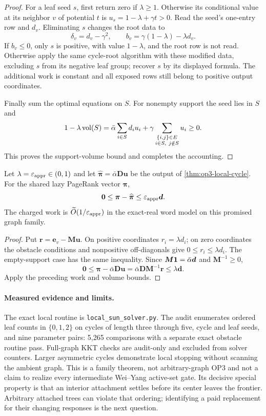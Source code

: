\begin{proof}
For a leaf seed $s$, first return zero if $\lambda\geq1$. Otherwise its
conditional value at its neighbor $v$ of potential $t$ is
$u_s=1-\lambda+\gamma t>0$. Read the seed's one-entry row and $d_v$.
Eliminating $s$ changes the root data to
\[
 \delta_v=d_v-\gamma^2,\qquad
 b_v=\gamma(1-\lambda)-\lambda d_v.
\]
If $b_v\leq0$, only $s$ is positive, with value $1-\lambda$, and the
root row is not read. Otherwise apply the same cycle-root algorithm with
these modified data, excluding $s$ from its negative leaf group; recover
$s$ by its displayed formula. The additional work is constant and all
exposed rows still belong to positive output coordinates.

Finally sum the optimal equations on $S$. For nonempty support the seed
lies in $S$ and
\[
 1-\lambda\operatorname{vol}(S)
 =\bar\alpha\sum_{i\in S}d_i u_i
   +\gamma\sum_{\substack{\{i,j\}\in E\\i\in S,\ j\notin S}}u_i
 \geq0.
\]
This proves the support-volume bound and completes the accounting.
\end{proof}

\begin{corollary}
\label{cor:op3-local-cycle-acl}
Let $\lambda=\varepsilon_{\mathrm{appr}}\in(0,1)$ and let
$\widehat{\bm\pi}=\bar\alpha\bm D\bm u$ be the output of
\cref{thm:op3-local-cycle}. For the shared lazy PageRank vector $\bm\pi$,
\[
 \bm0\leq\bm\pi-\widehat{\bm\pi}\leq\varepsilon_{\mathrm{appr}}\bm d.
\]
The charged work is $\widetilde O(1/\varepsilon_{\mathrm{appr}})$ in the exact-real word
model on this promised graph family.
\end{corollary}
\begin{proof}
Put $\bm r=\bm e_v-\bm M\bm u$. On positive coordinates
$r_i=\lambda d_i$; on zero coordinates the obstacle conditions and
nonpositive off-diagonals give $0\leq r_i\leq\lambda d_i$.
The empty-support case has the same inequality. Since
$\bm M\mathbf{1}=\bar\alpha\bm d$ and $\bm M^{-1}\geq0$,
\[
 \bm0\leq\bm\pi-\bar\alpha\bm D\bm u
 =\bar\alpha\bm D\bm M^{-1}\bm r
 \leq\lambda\bm d.
\]
Apply the preceding work and volume bounds.
\end{proof}

\paragraph{Measured evidence and limits.}
The exact local routine is \texttt{local\_sun\_solver.py}. The audit
enumerates ordered leaf counts in $\{0,1,2\}$ on cycles of length three
through five, cycle and leaf seeds, and nine parameter pairs: 5,265
comparisons with a separate exact obstacle routine pass. Full-graph KKT
checks are audit-only and excluded from solver counters. Larger asymmetric
cycles demonstrate local stopping without scanning the ambient graph.
This is a family theorem, not arbitrary-graph OP3 and not a claim to realize
every intermediate Wei--Yang active-set gate. Its decisive special property
is that an interior attachment settles before its center leaves the frontier.
Arbitrary attached trees can violate that ordering; identifying a paid
replacement for their changing responses is the next question.


